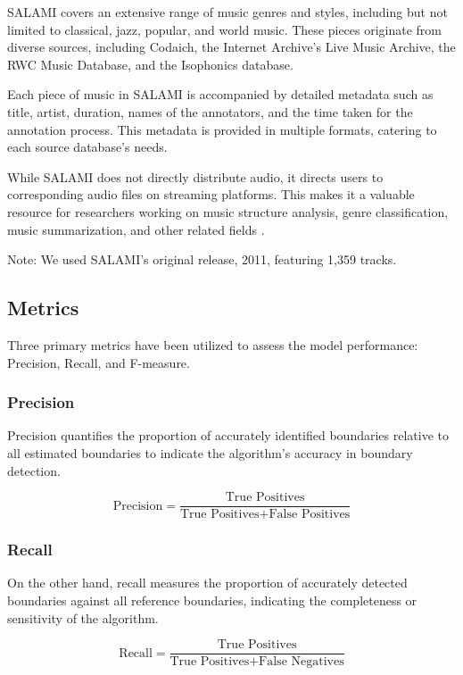 SALAMI covers an extensive range of music genres and styles, including but not limited to classical, jazz, popular, and world music. These pieces originate from diverse sources, including Codaich, the Internet Archive's Live Music Archive, the RWC Music Database, and the Isophonics database.

Each piece of music in SALAMI is accompanied by detailed metadata such as title, artist, duration, names of the annotators, and the time taken for the annotation process. This metadata is provided in multiple formats, catering to each source database's needs.

While SALAMI does not directly distribute audio, it directs users to corresponding audio files on streaming platforms. This makes it a valuable resource for researchers working on music structure analysis, genre classification, music summarization, and other related fields \cite{Smith2011DESIGNANNOTATIONS}.

Note: We used SALAMI's original release, 2011, featuring 1,359 tracks.

\subsection{Metrics}

Three primary metrics have been utilized to assess the model performance: Precision, Recall, and F-measure. 

\subsubsection{Precision}

Precision quantifies the proportion of accurately identified boundaries relative to all estimated boundaries to indicate the algorithm's accuracy in boundary detection.

\begin{equation}
\text{Precision} = \frac{\text{True Positives}}{\text{True Positives} + \text{False Positives}}
\end{equation}

\subsubsection{Recall}

On the other hand, recall measures the proportion of accurately detected boundaries against all reference boundaries, indicating the completeness or sensitivity of the algorithm.

\begin{equation}
\text{Recall} = \frac{\text{True Positives}}{\text{True Positives} + \text{False Negatives}}
\end{equation}

